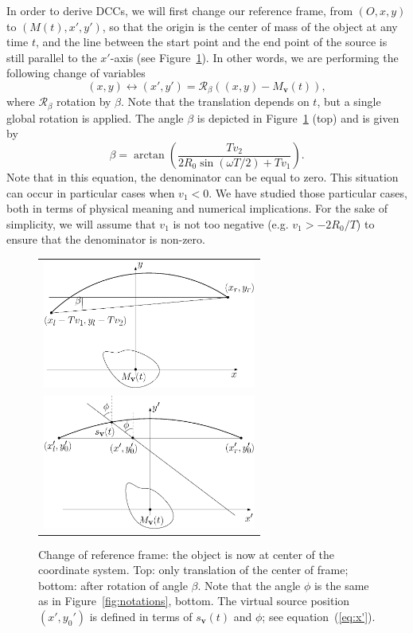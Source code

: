 \documentclass[twocolumn]{IEEEtran}
\newcommand{\Mbv}{M_{\mathbf{v}}}
\newcommand{\sbv}{s_{\mathbf{v}}}
\begin{document}
In order to derive DCCs, we will first change our reference frame, from $\left(O, x, y\right)$ to $\left(M(t), x', y'\right)$, so that the origin is the center of mass of the object at any time $t$, and the line between the start point and the end point of the source is still parallel to the $x'$-axis (see Figure~\ref{fig:change_frame}). In other words, we are performing the following change of variables
\begin{equation}
	(x,y) \leftrightarrow (x',y') = \mathcal{R}_{\beta} \left( (x,y)-\Mbv(t) \right),
\end{equation}
where $\mathcal{R}_{\beta}$ rotation by $\beta$. Note that the translation depends on $t$, but a single global rotation is applied. The angle $\beta$ is depicted in Figure~\ref{fig:change_frame} (top) and is given by
\begin{equation}
	\beta = \arctan \left( \frac{T v_2}{2R_0 \sin(\omega T/2) + T v_1} \right).
\end{equation}
Note that in this equation, the denominator can be equal to zero. This situation can occur in particular cases when $v_1 < 0$. We have studied those particular cases, both in terms of physical meaning and numerical implications. For the sake of simplicity, we will assume that $v_1$ is not too negative (e.g. $v_1 > - 2 R_0 / T$) to ensure that the denominator is non-zero.

\begin{figure}[!ht]
	\centering
	\begin{tabular}{c}
	\includegraphics[width=70mm]{figs/frame_object_before_rotation.eps} \\
	\includegraphics[width=70mm]{figs/frame_object.eps}
	\end{tabular}
	\caption{Change of reference frame: the object is now at center of the coordinate system. Top: only translation of the center of frame; bottom: after rotation of angle $\beta$. Note that the angle $\phi$ is the same as in Figure~\ref{fig:notations}, bottom. The virtual source position $(x',y_0')$ is defined in terms of $\sbv(t)$ and $\phi$; see equation~(\ref{eq:x'}).\label{fig:change_frame}}
\end{figure}
\end{document}
